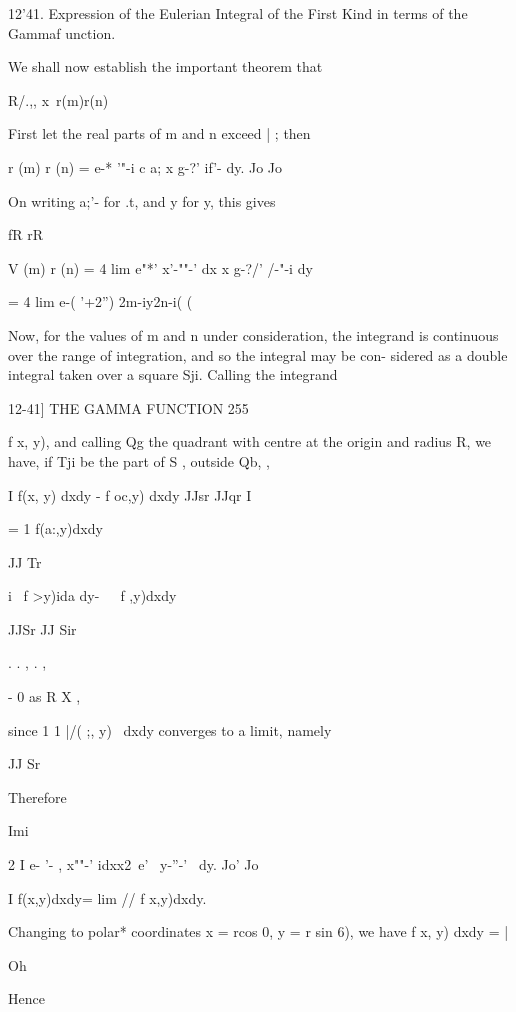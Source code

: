 12'41. Expression of the Eulerian Integral of the First Kind in terms of 
the Gammaf unction. 

We shall now establish the important theorem that 

R/.,,  x\  r(m)r(n) 

First let the real parts of m and n exceed | ; then 

r (m) r (n) = e-*  '"-i c a; x g-?' if'-  dy. 
Jo Jo 

On writing a;'- for .t, and y  for y, this gives 

fR rR 

V (m) r (n) = 4 lim e"*' x'-""-' dx x g-?/'  /-"-i dy 

= 4 lim e-( '+2'') 2m-iy2n-i( ( \  

Now, for the values of m and n under consideration, the integrand is 
continuous over the range of integration, and so the integral may be con- 
sidered as a double integral taken over a square Sji. Calling the integrand 



12-41] THE GAMMA FUNCTION 255 

f x, y), and calling Qg the quadrant with centre at the origin and radius R, 
we have, if Tji be the part of S , outside Qb, , 

I f(x, y) dxdy - f oc,y) dxdy 
JJsr JJqr I 

= 1 f(a:,y)dxdy 

 JJ Tr 

i \ f  >y)ida dy-\ \  \ f  ,y)dxdy\ 

JJSr JJ Sir 



  . . ,   . , 

- 0 as R  X , 

since 1 1 |/( ;, y) \ dxdy converges to a limit, namely 

JJ Sr 



Therefore 



Imi 



2 I e- '- , x""-' idxx2\ e'  \ y-''-' \ dy. 
Jo' Jo 

I f(x,y)dxdy= lim // f x,y)dxdy. 



Changing to polar* coordinates  x = rcos 0, y = r sin 6), we have 
f x, y) dxdy = | 

Oh 

Hence 



